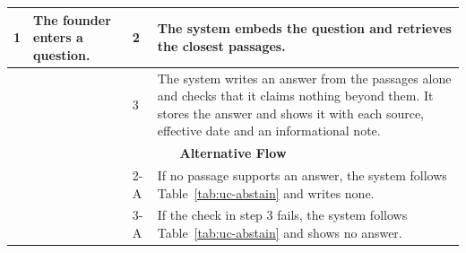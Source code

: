 \documentclass{FastFyp}
\begin{document}
\begin{longtable}{|p{}|p{}|p{}|p{}|p{}|}
\multicolumn{1}{|l|}{1} & \multicolumn{2}{p{0.42\textwidth}|}{The founder enters a question.} &
\multicolumn{1}{l|}{2} & The system embeds the question and retrieves the closest passages. \\ \hline
\multicolumn{1}{|l|}{} & \multicolumn{2}{p{0.42\textwidth}|}{} &
\multicolumn{1}{l|}{3} & The system writes an answer from the passages alone and checks that it claims nothing beyond them. It stores the answer and shows it with each source, effective date and an informational note. \\ \hline
\multicolumn{5}{|c|}{\textbf{Alternative Flow}} \\ \hline
\multicolumn{1}{|l|}{} & \multicolumn{2}{p{0.42\textwidth}|}{} &
\multicolumn{1}{l|}{2-A} & If no passage supports an answer, the system follows Table~\ref{tab:uc-abstain} and writes none. \\ \hline
\multicolumn{1}{|l|}{} & \multicolumn{2}{p{0.42\textwidth}|}{} &
\multicolumn{1}{l|}{3-A} & If the check in step 3 fails, the system follows Table~\ref{tab:uc-abstain} and shows no answer. \\ \hline
\end{longtable}
\end{document}
